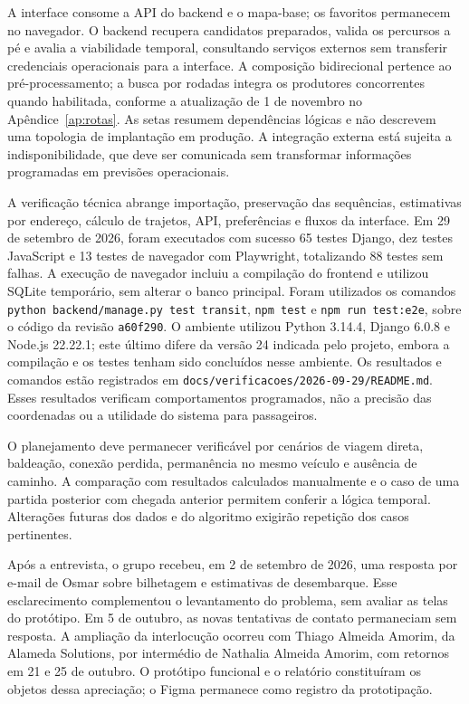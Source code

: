 \documentclass[12pt,oneside,a4paper,brazil,chapter=TITLE]{abntex2}
\begin{document}
A interface consome a API do backend e o mapa-base; os favoritos permanecem no navegador. O backend recupera candidatos preparados, valida os percursos a pé e avalia a viabilidade temporal, consultando serviços externos sem transferir credenciais operacionais para a interface. A composição bidirecional pertence ao pré-processamento; a busca por rodadas integra os produtores concorrentes quando habilitada, conforme a atualização de 1 de novembro no Apêndice~\ref{ap:rotas}. As setas resumem dependências lógicas e não descrevem uma topologia de implantação em produção. A integração externa está sujeita a indisponibilidade, que deve ser comunicada sem transformar informações programadas em previsões operacionais.

A verificação técnica abrange importação, preservação das sequências, estimativas por endereço, cálculo de trajetos, API, preferências e fluxos da interface. Em 29 de setembro de 2026, foram executados com sucesso 65 testes Django, dez testes JavaScript e 13 testes de navegador com Playwright, totalizando 88 testes sem falhas. A execução de navegador incluiu a compilação do frontend e utilizou SQLite temporário, sem alterar o banco principal. Foram utilizados os comandos \texttt{python backend/manage.py test transit}, \texttt{npm test} e \texttt{npm run test:e2e}, sobre o código da revisão \texttt{a60f290}. O ambiente utilizou Python 3.14.4, Django 6.0.8 e Node.js 22.22.1; este último difere da versão 24 indicada pelo projeto, embora a compilação e os testes tenham sido concluídos nesse ambiente. Os resultados e comandos estão registrados em \nolinkurl{docs/verificacoes/2026-09-29/README.md}. Esses resultados verificam comportamentos programados, não a precisão das coordenadas ou a utilidade do sistema para passageiros.

O planejamento deve permanecer verificável por cenários de viagem direta, baldeação, conexão perdida, permanência no mesmo veículo e ausência de caminho. A comparação com resultados calculados manualmente e o caso de uma partida posterior com chegada anterior permitem conferir a lógica temporal. Alterações futuras dos dados e do algoritmo exigirão repetição dos casos pertinentes.

Após a entrevista, o grupo recebeu, em 2 de setembro de 2026, uma resposta por e-mail de Osmar sobre bilhetagem e estimativas de desembarque. Esse esclarecimento complementou o levantamento do problema, sem avaliar as telas do protótipo. Em 5 de outubro, as novas tentativas de contato permaneciam sem resposta. A ampliação da interlocução ocorreu com Thiago Almeida Amorim, da Alameda Solutions, por intermédio de Nathalia Almeida Amorim, com retornos em 21 e 25 de outubro. O protótipo funcional e o relatório constituíram os objetos dessa apreciação; o Figma permanece como registro da prototipação.
\end{document}

